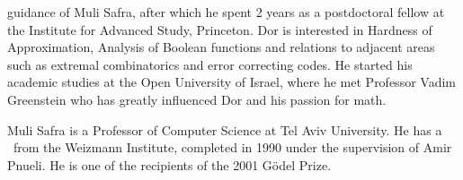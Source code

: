 \documentclass{toc}
\begin{document}
\begin{tocaboutauthors}
\begin{tocabout}[minzer]
guidance of Muli Safra, after which he spent 2 years as a %
postdoctoral  %
fellow at the Institute for Advanced Study, Princeton. Dor is interested in Hardness of Approximation,
Analysis of Boolean functions and relations to adjacent areas such as extremal combinatorics and error correcting codes. He started his academic studies %
at  %
the Open University of Israel, %
where  %
he met Professor Vadim Greenstein %
who  %
has greatly influenced Dor and his passion for math.
\end{tocabout}
\begin{tocabout}[safra]
Muli Safra is a Professor of Computer Science at Tel Aviv University. He has a \phd\ from the Weizmann Institute, completed in 1990 under the supervision of Amir Pnueli. He is one of the recipients of the 2001 G\"{o}del Prize.
\end{tocabout}
\end{tocaboutauthors}
\end{document}
